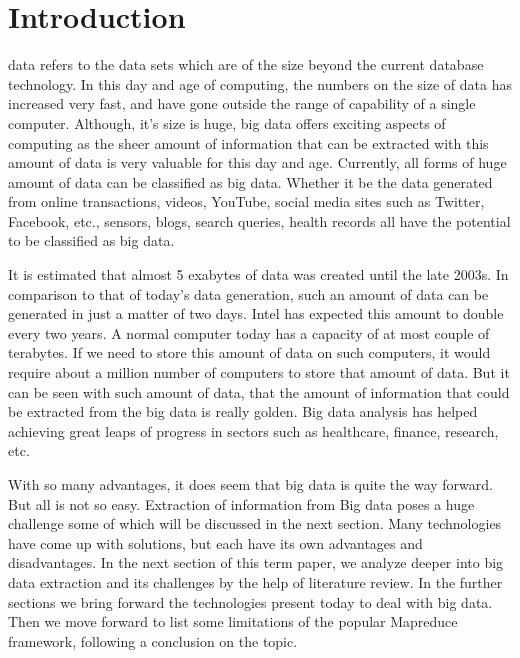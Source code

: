 \documentclass[journal]{IEEEtran}
\begin{document}
\section{Introduction}
% 
% 
% 
% 
 data refers to the data sets which are of the size beyond the current database technology. \cite{akerkar2013big} In this day and age of computing, the numbers on the size of data has increased very fast, and have gone outside the range of capability of a single computer. Although, it's size is huge, big data offers exciting aspects of computing as the sheer amount of information that can be extracted with this amount of data is very valuable for this day and age. Currently, all forms of huge amount of data can be classified as big data. Whether it be the data generated from online transactions, videos, YouTube, social media sites such as Twitter, Facebook, etc., sensors, blogs, search queries, health records all have the potential to be classified as big data. \cite{6567202}

It is estimated that almost 5 exabytes of data was created until the late 2003s. In comparison to that of today's data generation, such an amount of data can be generated in just a matter of two days. Intel has expected this amount to double every two years. \cite{IntelIT} A normal computer today has a capacity of at most couple of terabytes. If we need to store this amount of data on such computers, it would require about a million number of computers to store that amount of data. But it can be seen with such amount of data, that the amount of information that could be extracted from the big data is really golden. Big data analysis has helped achieving great leaps of progress in sectors such as healthcare, finance, research, etc.

With so many advantages, it does seem that big data is quite the way forward. But all is not so easy. Extraction of information from Big data poses a huge challenge some of which will be discussed in the next section. Many technologies have come up with solutions, but each have its own advantages and disadvantages. In the next section of this term paper, we analyze deeper into big data extraction and its challenges by the help of literature review. In the further sections we bring forward the technologies present today to deal with big data. Then we move forward to list some limitations of the popular Mapreduce framework, following a conclusion on the topic.
\end{document}
